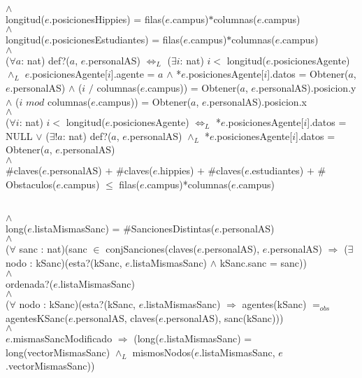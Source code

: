 {	\\
	$\land$
	\\
	longitud($e$.posicionesHippies) = filas($e$.campus)$*$columnas($e$.campus)
	\\
	$\land$
	\\
	longitud($e$.posicionesEstudiantes) = filas($e$.campus)$*$columnas($e$.campus)
	\\
	$\land$
	\\
	($\forall a$: nat) def?($a$, $e$.personalAS) $\Leftrightarrow_L$ ($\exists i$: nat) $i <$ longitud($e$.posicionesAgente) $\land_L$ $e$.posicionesAgente[$i$].agente = $a$ $\land$ *$e$.posicionesAgente[$i$].datos = Obtener($a$, $e$.personalAS) $\land$ ($i$ $/$ columnas($e$.campus)) = Obtener($a$, $e$.personalAS).posicion.y $\land$ ($i$ $mod$ columnas($e$.campus)) = Obtener($a$, $e$.personalAS).posicion.x
	\\
	$\land$
	\\
	($\forall i$: nat) $i <$ longitud($e$.posicionesAgente) $\Leftrightarrow_L$ *$e$.posicionesAgente[$i$].datos = NULL $\lor$ ($\exists! a$: nat) def?($a$, $e$.personalAS) $\land_L$ *$e$.posicionesAgente[$i$].datos = Obtener($a$, $e$.personalAS)
	\\
	$\land$
	\\
	$\#$claves($e$.personalAS) $+$ $\#$claves($e$.hippies) $+$ $\#$claves($e$.estudiantes) $+$ $\#$Obstaculos($e$.campus) $\leq$ filas($e$.campus)*columnas($e$.campus)

}\mbox{}
\\
	$\land$
	\\
	long($e$.listaMismasSanc) = $\#$SancionesDistintas($e$.personalAS)
	\\
	$\land$
	\\
	($\forall$ sanc : nat)(sanc $\in$ conjSanciones(claves($e$.personalAS), $e$.personalAS) $\Rightarrow$ ($\exists$ nodo : kSanc)(esta?(kSanc, $e$.listaMismasSanc) $\land$ kSanc.sanc = sanc))
	\\
	$\land$
	\\
	ordenada?($e$.listaMismasSanc)
	\\
	$\land$
	\\
	($\forall$ nodo : kSanc)(esta?(kSanc, $e$.listaMismasSanc) $\Rightarrow$ agentes(kSanc) $=_{obs}$ agentesKSanc($e$.personalAS, claves($e$.personalAS), sanc(kSanc)))
	\\
	$\land$
	\\
	$e$.mismasSancModificado $\Rightarrow$ (long($e$.listaMismasSanc) = long(vectorMismasSanc) $\land_L$ mismosNodos($e$.listaMismasSanc, $e$.vectorMismasSanc))
